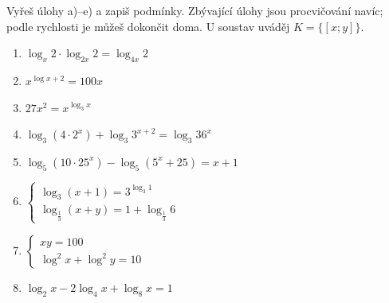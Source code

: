 \documentclass[11pt,a4paper]{article}
\begin{document}
Vyřeš úlohy a)--e) a zapiš podmínky. Zbývající úlohy jsou procvičování navíc; podle rychlosti je můžeš dokončit doma. U soustav uváděj $K=\{[x;y]\}$. 
\begin{zadaniBox}[title={Domácí úkol}]
\begin{enumerate}[label=\alph*)]
\item $\displaystyle \log_x2\cdot\log_{2x}2=\log_{4x}2$
\item $\displaystyle x^{\log x+2}=100x$
\item $\displaystyle 27x^2=x^{\log_3 x}$
\item $\displaystyle \log_3(4\cdot2^x)+\log_3 3^{x+2}=\log_3 36^x$
\item $\displaystyle \log_5(10\cdot25^x)-\log_5(5^x+25)=x+1$
\item $\displaystyle \begin{cases}\log_3(x+1)=3^{\log_3 1}\\ \log_{\frac13}(x+y)=1+\log_{\frac13}6\end{cases}$
\item $\displaystyle \begin{cases}xy=100\\\log^2 x+\log^2 y=10\end{cases}$
\item $\displaystyle \log_2x-2\log_4x+\log_8x=1$
\end{enumerate}
\end{zadaniBox}
\end{document}
